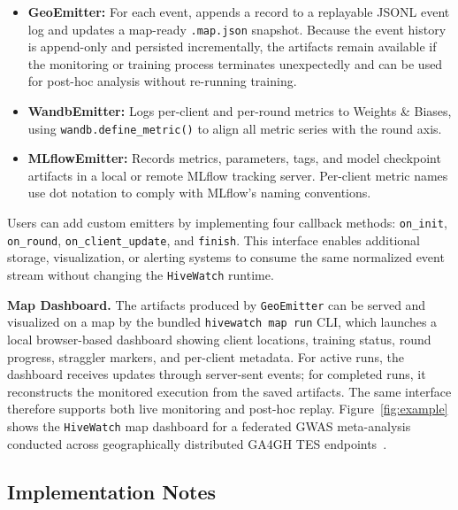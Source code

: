 \documentclass[preprint,12pt, a4paper]{elsarticle}
\begin{document}
\begin{itemize}[noitemsep]
    \item \textbf{GeoEmitter:} For each event, appends a record to a replayable JSONL event log and updates a map-ready \texttt{.map.json} snapshot. Because the event history is append-only and persisted incrementally, the artifacts remain available if the monitoring or training process terminates unexpectedly and can be used for post-hoc analysis without re-running training.
    \item \textbf{WandbEmitter:} Logs per-client and per-round metrics to Weights \& Biases, using \texttt{wandb.define\_metric()} to align all metric series with the round axis.
    \item \textbf{MLflowEmitter:} Records metrics, parameters, tags, and model checkpoint artifacts in a local or remote MLflow tracking server. Per-client metric names use dot notation to comply with MLflow's naming conventions.
\end{itemize}

Users can add custom emitters by implementing four callback methods: \texttt{on\_init}, \texttt{on\_round}, \texttt{on\_client\_update}, and \texttt{finish}. This interface enables additional storage, visualization, or alerting systems to consume the same normalized event stream without changing the \texttt{HiveWatch} runtime.

\textbf{Map Dashboard.}
The artifacts produced by \texttt{GeoEmitter} can be served and visualized on a map by the bundled \texttt{hivewatch map run} CLI, which launches a local browser-based dashboard showing client locations, training status, round progress, straggler markers, and per-client metadata. For active runs, the dashboard receives updates through server-sent events; for completed runs, it reconstructs the monitored execution from the saved artifacts. The same interface therefore supports both live monitoring and post-hoc replay. Figure~\ref{fig:example} shows the \texttt{HiveWatch} map dashboard for a federated GWAS meta-analysis conducted across geographically distributed GA4GH TES endpoints~\cite{chunduru2026towards}.


\subsection{Implementation Notes}
\end{document}
